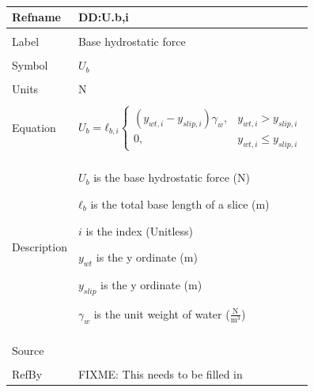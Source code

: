\documentclass[12pt]{article}
\begin{document}
~\newline
\noindent \begin{minipage}{\textwidth}
\begin{tabular}{p{} p{}}
\toprule \textbf{Refname} & \textbf{DD:U.b,i}
\label{DD:U.b,i}
\\ \midrule \\
Label & Base hydrostatic force
\\ \midrule \\
Symbol & ${U_{b}}$
\\ \midrule \\
Units & N
\\ \midrule \\
Equation & \begin{dmath}
           {U_{b}}={ℓ_{b,i}} \begin{cases}
\left({y_{wt,i}}-{y_{slip,i}}\right) {γ_{w}}, & {y_{wt,i}}>{y_{slip,i}}\\
0, & {y_{wt,i}}\leq{}{y_{slip,i}}
\end{cases}
           \end{dmath}
\\ \midrule \\
Description & \begin{symbDescription}
              \item{${U_{b}}$ is the base hydrostatic force (N)}
              \item{${ℓ_{b}}$ is the total base length of a slice (m)}
              \item{$i$ is the index (Unitless)}
              \item{${y_{wt}}$ is the y ordinate (m)}
              \item{${y_{slip}}$ is the y ordinate (m)}
              \item{${γ_{w}}$ is the unit weight of water ($\frac{\text{N}}{\text{m}^{3}}$)}
              \end{symbDescription}
\\ \midrule \\
Source & 
\\ \midrule \\
RefBy & FIXME: This needs to be filled in
\\ \bottomrule \end{tabular}
\end{minipage}\\
~\newline
\end{document}

